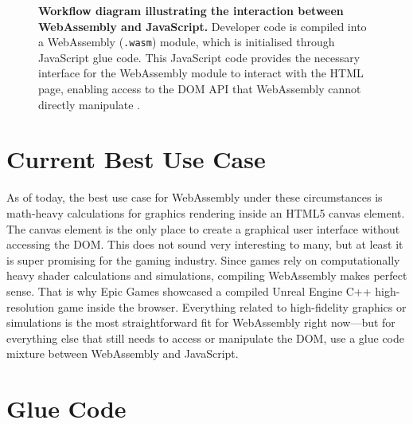 \documentclass[10pt]{article}
\begin{document}
\begin{sloppypar}
  \begin{figure}[ht]
    \centering
    \caption[Workflow diagram illustrating the interaction between WebAssembly and JavaScript.]{\textbf{Workflow diagram illustrating the interaction between WebAssembly and JavaScript.} Developer code is compiled into a WebAssembly (\lstinline{.wasm}) module, which is initialised through JavaScript glue code. This JavaScript code provides the necessary interface for the WebAssembly module to interact with the HTML page, enabling access to the DOM API that WebAssembly cannot directly manipulate \citep{mihaylov_how_2018}.}
    \label{fig:glue-code}
  \end{figure}

  \section{Current Best Use Case}
  \label{sec:use-cases}

  As of today, the best use case for WebAssembly under these circumstances is math-heavy calculations for graphics rendering inside an HTML5 canvas element. The canvas element is the only place to create a graphical user interface without accessing the DOM. This does not sound very interesting to many, but at least it is super promising for the gaming industry. Since games rely on computationally heavy shader calculations and simulations, compiling WebAssembly makes perfect sense. That is why Epic Games showcased a compiled Unreal Engine C++ high-resolution game inside the browser. Everything related to high-fidelity graphics or simulations is the most straightforward fit for WebAssembly right now—but for everything else that still needs to access or manipulate the DOM, use a glue code mixture between WebAssembly and JavaScript.

  \section{Glue Code}
  \label{sec:glue-code}


\end{sloppypar}
\end{document}
